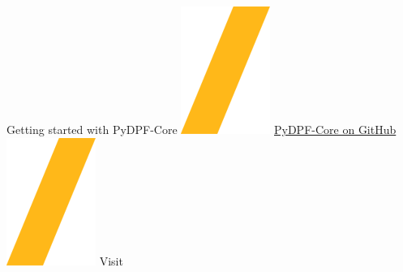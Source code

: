 \documentclass[9pt,landscape]{article}
\begin{document}
\vspace{-0.15cm}
\noindent\makebox[\linewidth]{\rule{\paperwidth}{4pt}}
\begin{center}
Getting started with PyDPF-Core \includegraphics[height=\fontcharht\font`\S]{slash.png} \href{https://github.com/ansys/pydpf-core}{{\color{blue}PyDPF-Core on GitHub}} \includegraphics[height=\fontcharht\font`\S]{slash.png} Visit 
\end{center}
\end{document}
